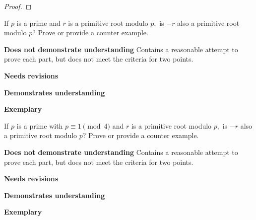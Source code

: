 \documentclass[letterpaper, 11pt]{../ximera}
\begin{document}
\begin{proof}
 
\end{proof}

\begin{ex}
	If $p$ is a prime and $r$ is a primitive root modulo $p,$ is $-r$ also a primitive root modulo $p$? Prove or provide a counter example.
\end{ex}

\begin{writeRubric}
    \item \textbf{Does not demonstrate understanding}
     Contains a reasonable attempt to prove each part, but does not meet the criteria for two points.
    \item \textbf{Needs revisions}
     
    \item \textbf{Demonstrates understanding}
    
    \item \textbf{Exemplary}
        
\end{writeRubric}
                                       
\begin{solution}
 
\end{solution}

\begin{ex}
	If $p$ is a prime with $p\equiv 1\pmod{4}$ and $r$ is a primitive root modulo $p,$ is $-r$ also a primitive root modulo $p$? Prove or provide a counter example.
\end{ex}

\begin{writeRubric}
    \item \textbf{Does not demonstrate understanding}
     Contains a reasonable attempt to prove each part, but does not meet the criteria for two points.
    \item \textbf{Needs revisions}
     
    \item \textbf{Demonstrates understanding}
    
    \item \textbf{Exemplary}
        
\end{writeRubric}
                                       
\begin{solution}
 
\end{solution}
\end{document}
